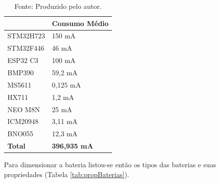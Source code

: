 \begin{table}[H]
\centering
\caption{Consumo dos componentes.}
\begin{tabular}{|l|l|}
\hline
\rowcolor[HTML]{C0C0C0} 
\multicolumn{1}{|c|}{\cellcolor[HTML]{C0C0C0}\textbf{Componente}} & \multicolumn{1}{c|}{\cellcolor[HTML]{C0C0C0}\textbf{Consumo Médio}} \\ \hline
STM32H723                                                            & 150 mA                                                               \\ \hline
STM32F446                                                            & 46 mA                                                              \\ \hline
ESP32 C3                                                               & 100 mA                                                               \\ \hline
BMP390                                                               & 59,2 mA                                                              \\ \hline
MS5611                                                               & 0,125 mA                                                             \\ \hline
HX711                                                                & 1,2 mA                                                               \\ \hline
NEO M8N                                                              & 25 mA                                                                \\ \hline
ICM20948                                                             & 3,11 mA                                                              \\ \hline
BNO055                                                               & 12,3 mA                                                              \\ \hline
\rowcolor[HTML]{C0C0C0} 
\textbf{Total}                                                       & \textbf{396,935 mA}                                                  \\ \hline
\end{tabular}
\label{Tab:ConsumoCompo}
\caption*{Fonte: Produzido pelo autor.}
\end{table}

Para dimensionar a bateria listou-se então os tipos das baterias e suas propriedades (Tabela \ref{tab:propBaterias}).

